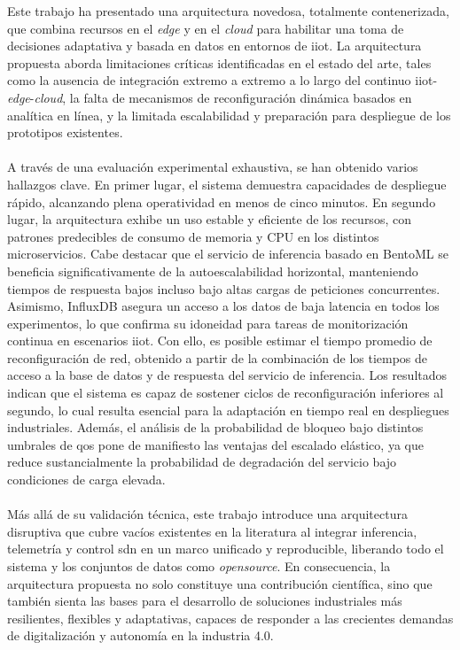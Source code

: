 Este trabajo ha presentado una arquitectura novedosa, totalmente contenerizada, que combina recursos en el \textit{edge} y en el \textit{cloud} para habilitar una toma de decisiones adaptativa y basada en datos en entornos de \gls{iiot}. La arquitectura propuesta aborda limitaciones críticas identificadas en el estado del arte, tales como la ausencia de integración extremo a extremo a lo largo del continuo \gls{iiot}-\textit{edge}-\textit{cloud}, la falta de mecanismos de reconfiguración dinámica basados en analítica en línea, y la limitada escalabilidad y preparación para despliegue de los prototipos existentes.\\
\\
A través de una evaluación experimental exhaustiva, se han obtenido varios hallazgos clave. En primer lugar, el sistema demuestra capacidades de despliegue rápido, alcanzando plena operatividad en menos de cinco minutos. En segundo lugar, la arquitectura exhibe un uso estable y eficiente de los recursos, con patrones predecibles de consumo de memoria y CPU en los distintos microservicios.  Cabe destacar que el servicio de inferencia basado en BentoML se beneficia significativamente de la autoescalabilidad horizontal, manteniendo tiempos de respuesta bajos incluso bajo altas cargas de peticiones concurrentes. Asimismo, InfluxDB asegura un acceso a los datos de baja latencia en todos los experimentos, lo que confirma su idoneidad para tareas de monitorización continua en escenarios \gls{iiot}. Con ello, es posible estimar el tiempo promedio de reconfiguración de red, obtenido a partir de la combinación de los tiempos de acceso a la base de datos y de respuesta del servicio de inferencia. Los resultados indican que el sistema es capaz de sostener ciclos de reconfiguración inferiores al segundo, lo cual resulta esencial para la adaptación en tiempo real en despliegues industriales. Además, el análisis de la probabilidad de bloqueo bajo distintos umbrales de \gls{qos} pone de manifiesto las ventajas del escalado elástico, ya que reduce sustancialmente la probabilidad de degradación del servicio bajo condiciones de carga elevada.\\
\\
Más allá de su validación técnica, este trabajo introduce una arquitectura disruptiva que cubre vacíos existentes en la literatura al integrar inferencia, telemetría y control \gls{sdn} en un marco unificado y reproducible, liberando todo el sistema y los conjuntos de datos como \textit{opensource}. En consecuencia, la arquitectura propuesta no solo constituye una contribución científica, sino que también sienta las bases para el desarrollo de soluciones industriales más resilientes, flexibles y adaptativas, capaces de responder a las crecientes demandas de digitalización y autonomía en la industria 4.0. 
